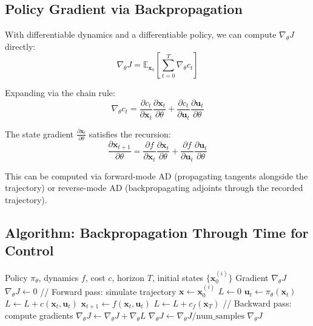 \subsection{Policy Gradient via Backpropagation}

With differentiable dynamics and a differentiable policy, we can compute $\nabla_\theta J$ directly:
\begin{equation}
\nabla_\theta J = \mathbb{E}_{\mathbf{x}_0}\left[ \sum_{t=0}^{T} \nabla_\theta c_t \right]
\label{eq:policy_gradient_direct}
\end{equation}

Expanding via the chain rule:
\begin{equation}
\nabla_\theta c_t = \frac{\partial c_t}{\partial \mathbf{x}_t} \frac{\partial \mathbf{x}_t}{\partial \theta} + \frac{\partial c_t}{\partial \mathbf{u}_t} \frac{\partial \mathbf{u}_t}{\partial \theta}
\end{equation}

The state gradient $\frac{\partial \mathbf{x}_t}{\partial \theta}$ satisfies the recursion:
\begin{equation}
\frac{\partial \mathbf{x}_{t+1}}{\partial \theta} = \frac{\partial f}{\partial \mathbf{x}_t} \frac{\partial \mathbf{x}_t}{\partial \theta} + \frac{\partial f}{\partial \mathbf{u}_t} \frac{\partial \mathbf{u}_t}{\partial \theta}
\end{equation}

This can be computed via forward-mode AD (propagating tangents alongside the trajectory) or reverse-mode AD (backpropagating adjoints through the recorded trajectory).

\subsection{Algorithm: Backpropagation Through Time for Control}

\begin{algorithm}[H]
\caption{Policy Gradient via Differentiable Simulation}
\label{alg:bptt_control}
\begin{algorithmic}[1]
\REQUIRE Policy $\pi_\theta$, dynamics $f$, cost $c$, horizon $T$, initial states $\{\mathbf{x}_0^{(i)}\}$
\ENSURE Gradient $\nabla_\theta J$
\STATE $\nabla_\theta J \gets 0$
    \STATE // Forward pass: simulate trajectory
    \STATE $\mathbf{x} \gets \mathbf{x}_0^{(i)}$
    \STATE $L \gets 0$
        \STATE $\mathbf{u}_t \gets \pi_\theta(\mathbf{x}_t)$
        \STATE $L \gets L + c(\mathbf{x}_t, \mathbf{u}_t)$
        \STATE $\mathbf{x}_{t+1} \gets f(\mathbf{x}_t, \mathbf{u}_t)$
    \ENDFOR
    \STATE $L \gets L + c_f(\mathbf{x}_T)$
    \STATE // Backward pass: compute gradients
    \STATE $\nabla_\theta J \gets \nabla_\theta J + \nabla_\theta L$ 
\ENDFOR
\STATE $\nabla_\theta J \gets \nabla_\theta J / \text{num\_samples}$
\RETURN $\nabla_\theta J$
\end{algorithmic}
\end{algorithm}

